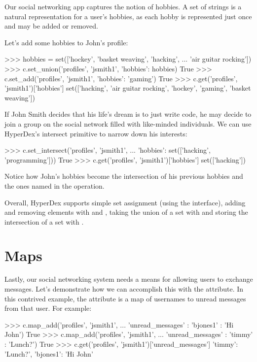Our social networking app captures the notion of hobbies.  A set of strings is a
natural representation for a user's hobbies, as each hobby is represented just
once and may be added or removed.

Let's add some hobbies to John's profile:

\begin{pythoncode}
>>> hobbies = set(['hockey', 'basket weaving', 'hacking',
...                'air guitar rocking'])
>>> c.set_union('profiles', 'jsmith1', {'hobbies': hobbies})
True
>>> c.set_add('profiles', 'jsmith1', {'hobbies': 'gaming'})
True
>>> c.get('profiles', 'jsmith1')['hobbies']
set(['hacking', 'air guitar rocking', 'hockey', 'gaming', 'basket weaving'])
\end{pythoncode}

If John Smith decides that his life's dream is to just write code, he may decide
to join a group on the social network filled with like-minded individuals.  We
can use HyperDex's intersect primitive to narrow down his interests:

\begin{pythoncode}
>>> c.set_intersect('profiles', 'jsmith1',
...                 {'hobbies': set(['hacking', 'programming'])})
True
>>> c.get('profiles', 'jsmith1')['hobbies']
set(['hacking'])
\end{pythoncode}

Notice how John's hobbies become the intersection of his previous hobbies and
the ones named in the operation.

Overall, HyperDex supports simple set assignment (using the 
interface), adding and removing elements with  and
, taking the union of a set with  and storing
the intersection of a set with .

\section{Maps}
\label{sec:data-types:maps}

Lastly, our social networking system needs a means for allowing users to
exchange messages.  Let's demonstrate how we can accomplish this with the
 attribute. In this contrived example, the
 attribute is a map of usernames to unread messages from
that user.  For example:

\begin{pythoncode}
>>> c.map_add('profiles', 'jsmith1',
...           {'unread_messages' : {'bjones1' : 'Hi John'}})
True
>>> c.map_add('profiles', 'jsmith1',
...           {'unread_messages' : {'timmy' : 'Lunch?'}})
True
>>> c.get('profiles', 'jsmith1')['unread_messages']
{'timmy': 'Lunch?', 'bjones1': 'Hi John'}
\end{pythoncode}

